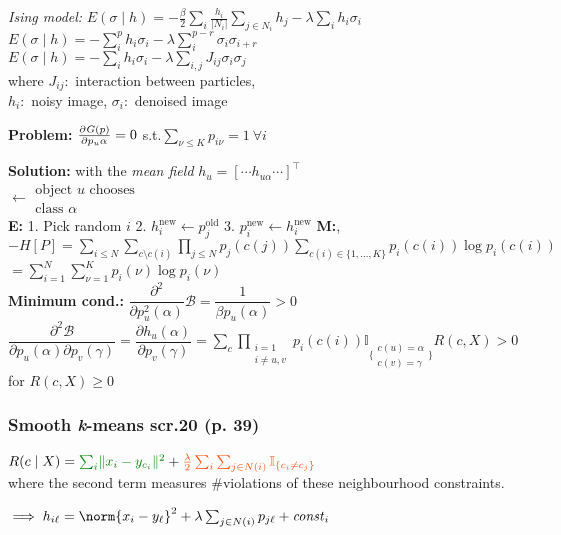 \emph{Ising model:}\enskip
$E(\sigma\mid h) = -\frac{\beta}{2} \sum_i \frac{h_i}{|N_i|} \sum_{j \in N_i} h_j - \lambda \sum_i h_i \sigma_i$\\
$E(\sigma\mid h) = - \sum_i^p h_i \sigma_i  -\lambda\sum_i^{p-r}\sigma_i\sigma_{i+r} $\\
$E(\sigma\mid h) =  - \sum_i h_i \sigma_i - \lambda\sum_{i,j} J_{ij} \sigma_i \sigma_j$
\\
where $J_{ij}$:\, interaction between particles,\\\phantom{where}
$h_i$:\, noisy image,\enskip
$\sigma_i$:\, denoised image

\textbf{Problem:} \quad $\pderiv{G(p)}{p_u\alpha} = 0$ \enspace s.t.\enspace $\sum_{\nu\leq K} p_{i\nu} = 1 \: \forall i$

\textbf{Solution:}\quad
with the \textit{mean field} $h_u = [\cdots h_{u\alpha} \cdots]^\top$
\\
 $\leftarrow \substack{\text{object }u\text{ chooses}\\\text{class } \alpha}$
\\


\textbf{E:} 1. Pick random $i$ 2. $h_i^{\text{new}} \leftarrow p_j^{\text{old}}$ 3. $p_i^{\text{new}} \leftarrow h_i^{\text{new}}$
\textbf{M:},\\

$-H[P]=\underset{i\leq N}{\sum}\underset{c\setminus c(i)}{\sum}\underset{j\leq N}{\prod} p_j(c(j))\underset{{c(i)\in \{1,...,K\}}}{\sum}p_i(c(i))\log p_i(c(i))$\newline
$=\sum_{i=1}^{N}\sum_{\nu=1}^{K}p_i(\nu) \log p_i(\nu)$\\
\textbf{Minimum cond.:} $\dfrac{\partial^2}{\partial p_u^2(\alpha)} \mathcal{B}=\dfrac{1}{\beta p_u(\alpha)}>0$\\
$\dfrac{\partial^2\mathcal{B}}{\partial p_u(\alpha)\partial p_v(\gamma)}=\dfrac{\partial h_u(\alpha)}{\partial p_v(\gamma)}=\sum_c\prod_{\substack{i = 1 \\ i\neq u, v}}p_i(c(i))\mathbb{I}_{\{\substack{c(u)=\alpha \\ c(v)=\gamma}\}}R(c, X)>0$ for $R(c, X)\geq 0$


\subsubsection{Smooth \textit{\rmfamily k}-means
\qquad\normalfont\sffamily\color{gray}scr.20 (p. 39)}

$R(c\mid X) =
{\color{Green} \sum_i \lVert x_i - y_{c_i} \rVert^2}
+
{\color{OrangeRed} \frac\lambda2 \sum_i \sum_{j\in N(i)} \mathbb I_{\{c_i \neq c_j\}}}$
\\
where the second term measures {\color{OrangeRed} \#violations} of these neighbourhood constraints.

$\implies h_{i\ell} = \norm{x_i - y_\ell}^2 + \lambda \sum_{j\in N(i)} p_{j\ell} + \mathit{const}_i$

